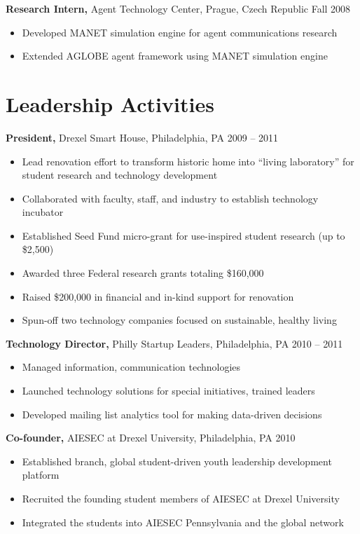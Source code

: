 \documentclass[margin]{res}
\begin{document}
\begin{resume}
{\bf Research Intern,} Agent Technology Center, Prague, Czech Republic \hfill  Fall 2008
\begin{itemize} \itemsep -2pt %
\item Developed MANET simulation engine for agent communications research
\item Extended AGLOBE agent framework using MANET simulation engine 
\end{itemize}

\section{Leadership  Activities} 
     {\bf President,} Drexel Smart House, Philadelphia, PA \hfill 2009 -- 2011 
     \begin{itemize} \itemsep -2pt
     \item Lead renovation effort to transform historic home into ``living laboratory'' for student research and technology development 
     \item Collaborated with faculty, staff, and industry to establish technology incubator
     \item Established Seed Fund micro-grant for use-inspired student research (up to \$2,500)   
     \item Awarded three Federal research grants totaling \$160,000
     \item Raised \$200,000 in financial and in-kind support for renovation
	\item Spun-off two technology companies focused on sustainable, healthy living
	\end{itemize}

	{\bf  Technology Director,}  Philly Startup Leaders, Philadelphia, PA \hfill 2010 -- 2011 
	\begin{itemize} \itemsep -2pt
	\item Managed information, communication technologies 
	\item Launched technology solutions for special initiatives, trained leaders 
	\item Developed mailing list analytics tool for making data-driven decisions 
	\end{itemize}

     {\bf Co-founder,} AIESEC at Drexel University, Philadelphia, PA \hfill 2010 
     \begin{itemize} \itemsep -2pt
     \item Established branch, global student-driven youth leadership development platform
     \item Recruited the founding student members of AIESEC at Drexel University
	\item Integrated the students into AIESEC Pennsylvania and the global network
	\end{itemize}


\end{resume}
\end{document}
